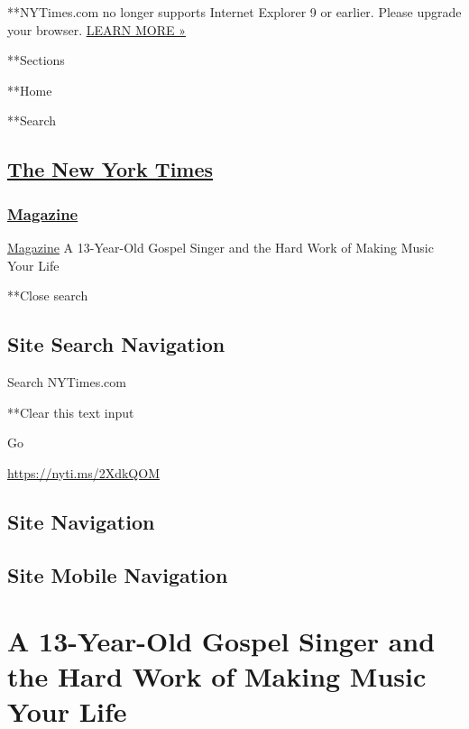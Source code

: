  **NYTimes.com no longer supports Internet Explorer 9 or earlier. Please
upgrade your browser.
\href{http://www.nytimes3xbfgragh.onion/content/help/site/ie9-support.html}{LEARN
MORE »}

**Sections

**Home

**Search

\hypertarget{the-new-york-times}{%
\subsection{\texorpdfstring{\href{http://www.nytimes3xbfgragh.onion/}{The
New York Times}}{The New York Times}}\label{the-new-york-times}}

\hypertarget{-magazine-}{%
\subsubsection{\texorpdfstring{
\href{https://www.nytimes3xbfgragh.onion/section/magazine}{Magazine}
}{ Magazine }}\label{-magazine-}}

 \href{https://www.nytimes3xbfgragh.onion/section/magazine}{Magazine}
\textbar{}A 13-Year-Old Gospel Singer and the Hard Work of Making Music
Your Life

**Close search

\hypertarget{site-search-navigation}{%
\subsection{Site Search Navigation}\label{site-search-navigation}}

Search NYTimes.com

**Clear this text input

Go

\url{https://nyti.ms/2XdkQOM}

\hypertarget{site-navigation}{%
\subsection{Site Navigation}\label{site-navigation}}

\hypertarget{site-mobile-navigation}{%
\subsection{Site Mobile Navigation}\label{site-mobile-navigation}}

\hypertarget{a-13-year-old-gospel-singer-and-the-hard-work-of-making-music-your-life}{%
\section{A 13-Year-Old Gospel Singer and the Hard Work of Making Music
Your
Life}\label{a-13-year-old-gospel-singer-and-the-hard-work-of-making-music-your-life}}

